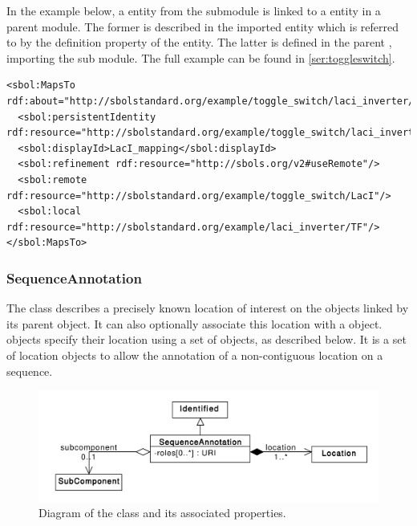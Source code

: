 In the example below, a  entity from the submodule is linked to a  entity in a parent module. The former is described in the imported  entity which is referred to by the definition property of the  entity. The latter is defined in the parent , importing the sub module. The full example can be found in \ref{ser:toggleswitch}.
\begin{lstlisting}
<sbol:MapsTo rdf:about="http://sbolstandard.org/example/toggle_switch/laci_inverter/LacI_mapping">
  <sbol:persistentIdentity rdf:resource="http://sbolstandard.org/example/toggle_switch/laci_inverter/LacI_mapping"/>
  <sbol:displayId>LacI_mapping</sbol:displayId>
  <sbol:refinement rdf:resource="http://sbols.org/v2#useRemote"/>
  <sbol:remote rdf:resource="http://sbolstandard.org/example/toggle_switch/LacI"/>
  <sbol:local rdf:resource="http://sbolstandard.org/example/laci_inverter/TF"/>
</sbol:MapsTo>
\end{lstlisting}


\subsubsection{SequenceAnnotation}
\label{sec:SequenceAnnotation}
The  class describes a precisely known location of interest on the  objects linked by its parent  object.  It can also optionally associate this location with a  object.  objects specify their location using a set of   objects, as described below.  It is a set of location objects to allow the annotation of a non-contiguous location on a sequence.


\begin{figure}[ht]
\begin{center}
\includegraphics[scale=0.6]{uml/sequence_annotation}
\caption[]{Diagram of the  class and its associated properties.}
\label{uml:sequence_annotation}
\end{center}
\end{figure}

